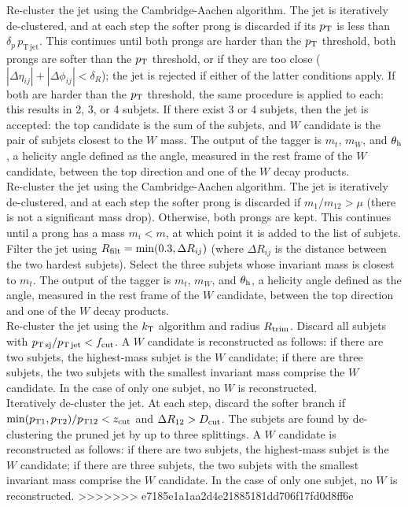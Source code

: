  Re-cluster the jet using the Cambridge-Aachen algorithm. The jet is iteratively de-clustered, and at each step the softer prong is discarded if its $p_{\rm T}$ is less than $\delta_p\,p_{\mathrm{T\,jet}}$. This continues until both prongs are harder than the $p_{\rm T}$ threshold, both prongs are softer than the $p_{\rm T}$ threshold, or if they are too close ($|\Delta\eta_{ij}|+|\Delta\phi_{ij}|<\delta_R$); the jet is rejected if either of the latter conditions apply. If both are harder than the $p_{\rm T}$ threshold, the same procedure is applied to each: this results in 2, 3, or 4 subjets. If there exist 3 or 4 subjets, then the jet is accepted: the top candidate is the sum of the subjets, and $W$ candidate is the pair of subjets closest to the $W$ mass. The output of the tagger is $m_t$, $m_W$, and $\theta_{\rm h}$, a helicity angle defined as the angle, measured in the rest frame of the $W$ candidate, between the top direction and one of the $W$ decay products.\\

 Re-cluster the jet using the Cambridge-Aachen algorithm. The jet is iteratively de-clustered, and at each step the softer prong is discarded if $m_1/m_{12}>\mu$ (there is not a significant mass drop). Otherwise, both prongs are kept. This continues until a prong has a mass $m_i < m$, at which point it is added to the list of subjets. Filter the jet using $R_{\rm filt}=\mathrm{min}(0.3,\Delta R_{ij})$ (where $\Delta R_{ij}$ is the distance between the two hardest subjets). Select the three subjets whose invariant mass is closest to $m_t$. The output of the tagger is $m_t$, $m_W$, and $\theta_{\rm h}$, a helicity angle defined as the angle, measured in the rest frame of the $W$ candidate, between the top direction and one of the $W$ decay products.\\

 Re-cluster the jet using the $k_{\rm T}$ algorithm and radius $R_{\rm trim}$. Discard all subjets with $p_{\rm T\,sj}/p_{\rm T\,jet} < f_{\rm cut}$. A $W$ candidate is reconstructed as follows: if there are two subjets, the highest-mass subjet is the $W$ candidate; if there are three subjets, the two subjets with the smallest invariant mass comprise the $W$ candidate. In the case of only one subjet, no $W$ is reconstructed.\\

 Iteratively de-cluster the jet. At each step, discard the softer branch if $\mathrm{min}(p_{\rm T1},p_{\rm T2}) / p_{\rm T12} < z_{\rm cut}$ and $\Delta R_{12}>D_{\rm cut}$. The subjets are found by de-clustering the pruned jet by up to three splittings. A $W$ candidate is reconstructed as follows: if there are two subjets, the highest-mass subjet is the $W$ candidate; if there are three subjets, the two subjets with the smallest invariant mass comprise the $W$ candidate. In the case of only one subjet, no $W$ is reconstructed.
>>>>>>> e7185e1a1aa2d4e21885181dd706f17fd0d8ff6e
